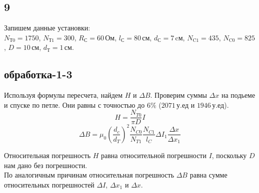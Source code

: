 \subsection*{9}
Запишем данные установки:\\
$N_\text{Т0}=1750$, $N_\text{Т1}=300$, $R_\text{С}=60\,\text{Ом}$, $l_\text{С}=80\,\text{см}$, $d_\text{С}=7\,\text{cм}$, $N_\text{C1}=435$, $N_\text{C0}=825$, $D=10\,\text{см}$, $d_\text{Т}=1\,\text{см}$.
\subsection*{обработка-1-3}
Используя формулы пересчета, найдем $H$ и $\Delta B$.
Проверим суммы $\Delta x$ на подьеме и спуске по петле. Они равны с точностью до $6\%$ ($2071\,\text{у.ед}$ и $1946\,\text{у.ед}$).
$$H=\frac{N_{T0}}{\pi D}I$$
$$\Delta B = \mu_0 \left(\frac{d_c}{d_T}\right)^2\frac{N_{C0}}{N_{T1}}\frac{N_{C1}}{l_C}\Delta I_1 \frac{\Delta x}{\Delta x_1}$$

Относительная погрешность $H$ равна относительной погрешности $I$, поскольку $D$ нам дано без погрешности.\\
По аналогичным причинам относительная погрешность $\Delta B$ равна сумме относительных погрешностей $\Delta I$, $\Delta x_1$ и $\Delta x$.

\newpage

